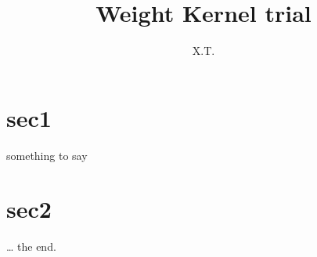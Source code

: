 \documentclass[a4paper, 11pt]{article}
\author{X.T.}
\title{Weight Kernel trial}
\begin{document}
\maketitle
\tableofcontents
\section{sec1}
something to say
\section{sec2}
\ldots{} the end.
\end{document}
